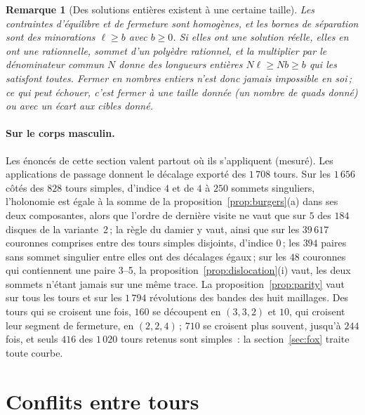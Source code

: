 \documentclass[11pt,a4paper]{article}
\newtheorem{remark}{Remarque}
\newcommand{\lean}[1]{\texttt{\detokenize{#1}}}
\newenvironment{evidence}[3][]{}{}
\begin{document}
\begin{evidence}{lean}{\lean{whole_solution_of_real}, \lean{clear_denominators}}
\begin{remark}[Des solutions entières existent à une certaine taille]\label{rem:exist}
Les contraintes d'équilibre et de fermeture sont homogènes, et les bornes de
séparation sont des minorations $\ell \ge b$ avec $b \ge 0$. Si elles ont une
solution réelle, elles en ont une rationnelle, sommet d'un polyèdre rationnel,
et la multiplier par le dénominateur commun $N$ donne des longueurs entières
$N\ell \ge Nb \ge b$ qui les satisfont toutes. Fermer en nombres entiers n'est
donc jamais impossible en soi\,; ce qui peut échouer, c'est fermer \emph{à une
taille donnée} (un nombre de quads donné) ou avec un écart aux cibles donné.
\end{remark}
\end{evidence}

\paragraph{Sur le corps masculin.}
Les énoncés de cette section valent partout où ils s'appliquent (mesuré). Les
applications de passage donnent le décalage exporté des $1\,708$ tours. Sur
les $1\,656$ côtés des $828$ tours simples, d'indice $4$ et de $4$ à $250$
sommets singuliers, l'holonomie est égale à la somme de la
proposition~\ref{prop:burgers}(a) dans ses deux composantes, alors que l'ordre
de dernière visite ne vaut que sur $5$ des $184$ disques de la variante~2\,; la
règle du damier y vaut, ainsi que sur les $39\,617$ couronnes comprises entre
des tours simples disjoints, d'indice $0$\,; les $394$ paires sans sommet
singulier entre elles ont des décalages égaux\,; sur les $48$ couronnes qui
contiennent une paire 3--5, la proposition~\ref{prop:dislocation}(i) vaut, les
deux sommets n'étant jamais sur une même trace. La
proposition~\ref{prop:parity} vaut sur tous les tours et sur les $1\,794$
révolutions des bandes des huit maillages. Des tours qui se croisent une
fois, $160$ se découpent en $(3, 3, 2)$ et $10$, qui croisent leur segment de
fermeture, en $(2, 2, 4)$\,; $710$ se croisent plus souvent, jusqu'à $244$
fois, et seuls $416$ des $1\,020$ tours retenus sont simples~: la
section~\ref{sec:fox} traite toute courbe.

\section{Conflits entre tours}\label{sec:conflicts}
\end{document}
